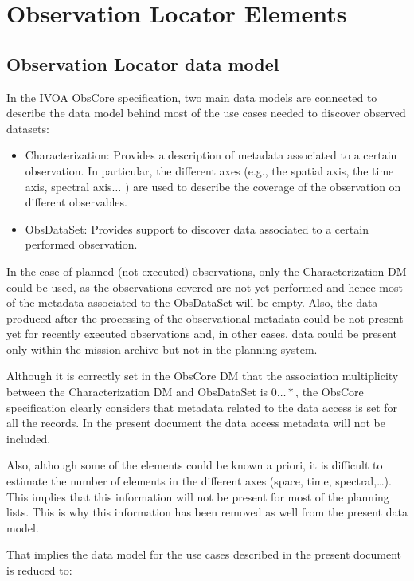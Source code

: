 \documentclass[11pt,a4paper]{ivoa}
\begin{document}
\section{Observation Locator Elements}
\subsection{Observation Locator data model }
In the IVOA ObsCore specification, two main data models are connected to describe the 
data model behind most of the use cases needed to discover observed datasets:

\begin{itemize}
	\item Characterization: Provides a description of metadata associated to a certain observation. In particular, the different axes (e.g., the spatial axis, the time axis, spectral axis$ \ldots $ ) are used to describe the coverage of the observation on different observables.
	\item ObsDataSet: Provides support to discover data associated to a certain performed observation.
\end{itemize}

In the case of planned (not executed) observations, only the Characterization DM could be
used, as the observations covered are not yet performed and hence most of the metadata 
associated to the ObsDataSet will be empty. Also, the data produced after the 
processing of the observational metadata could be not present yet for recently executed 
observations and, in other cases, data could be present only within the mission archive 
but not in the planning system. 

Although it is correctly set in the ObsCore DM that the association multiplicity 
between the Characterization DM and ObsDataSet is $0\ldots\ast$, the ObsCore 
specification clearly considers that metadata related to the data access is set for 
all the records. In the present document the data access metadata will not be included.

Also, although some of the elements could be known a priori, it is difficult to 
estimate the number of elements in the different axes (space, time, spectral,\dots). 
This implies that this information will not be present for most of the planning lists. 
This is why this information has been removed as well from the present data model.

That implies the data model for the use cases described in the present document is 
reduced to:
\end{document}
